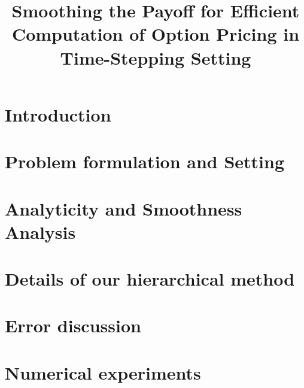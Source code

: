 \documentclass[11pt]{article}
\title{ Smoothing  the  Payoff for  Efficient Computation of Option Pricing in
  Time-Stepping Setting}
\date{ }
\begin{document}
\maketitle

%


\section{Introduction}



\section{Problem formulation and Setting}\label{sec:General setting}





%
\section{Analyticity  and Smoothness Analysis}\label{sec:Analiticity Analysis}

\section{Details of our hierarchical method}\label{sec:Details of our approach}



\section{Error discussion}\label{sec:Error discussion}


\section{Numerical experiments}



 


%
\end{document}
